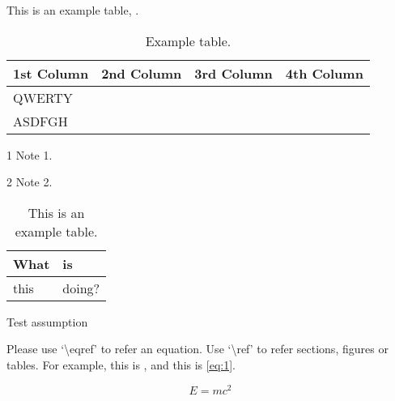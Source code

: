 \begin{tempsection}
    This is an example table, .
    \begin{table}[htbp]
        \begin{center}
        \begin{threeparttable}
        \caption{Example table.\label{tb:this_is_table}}
        \centering
            \begin{tabular}{l c c c}
                \toprule
                    \textbf{1st Column} & \textbf{2nd Column} & \textbf{3rd Column} & \textbf{4th Column} \\ 
                \midrule
                    QWERTY\tnote{1}   &                     &                     &  \\
                    ASDFGH\tnote{2}   &                     &                     &  \\ 
                \bottomrule
            \end{tabular}
            \begin{tablenotes}
                \item [1] Note 1. 
                \item [2] Note 2.
            \end{tablenotes}
        \end{threeparttable}
    \end{center}
    \end{table}

    \begingroup
    \begin{table}
        \centering
        \caption{This is an example table.}\label{tbl:nicetablelesstable}
        \begin{tabular}{ll}
            What & is     \\
            \hline
            this & doing? \\
        \end{tabular}
    \end{table}
    \endgroup

    \begin{assumption}
        Test assumption
    \end{assumption}

    Please use `\textbackslash eqref' to refer an equation. Use `\textbackslash ref' to refer sections, figures or tables. For example, this is , and this is \eqref{eq:1}.

    \begin{equation}
        E = mc^2
        \label{eq:1}
    \end{equation}

\end{tempsection}